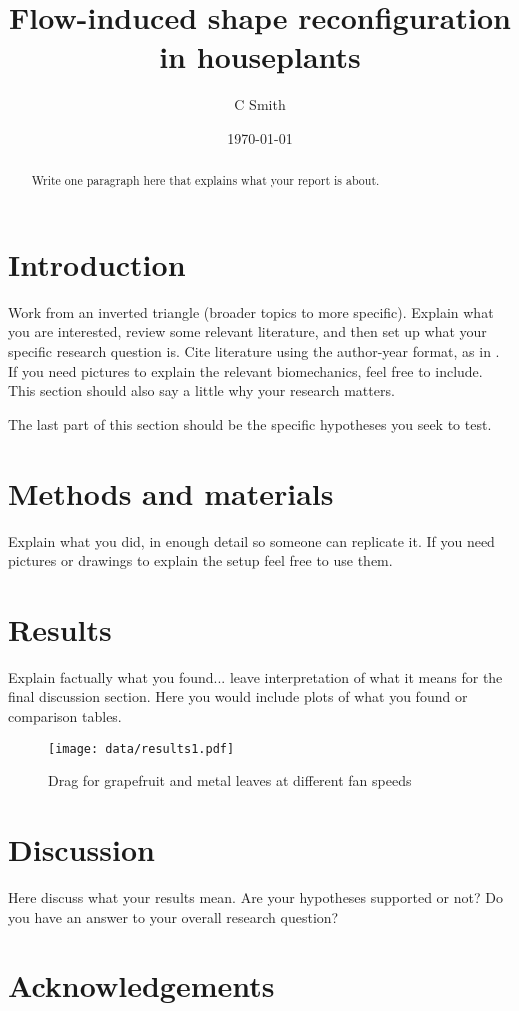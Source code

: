 \documentclass{article}
\title{Flow-induced shape reconfiguration in houseplants}
\author{C Smith}
\date{\today}
\begin{document}
\maketitle
\begin{abstract}
Write one paragraph here that explains what your report is about.
\end{abstract}

\section{Introduction}
Work from an inverted triangle (broader topics to more specific). Explain what you are interested, review some relevant literature, and then set up what your specific research question is. Cite literature using the author-year format, as in \citep{buck2020go}. If you need pictures to explain the relevant biomechanics, feel free to include. This section should also say a little why your research matters. 

The last part of this section should be the specific hypotheses you seek to test. 

\section{Methods and materials}
Explain what you did, in enough detail so someone can replicate it. If you need pictures or drawings to explain the setup feel free to use them. 

\section{Results}
Explain factually what you found... leave interpretation of what it means for the final discussion section. Here you would include plots of what you found or comparison tables.
\begin{figure}
    \begin{center}
        \texttt{[image: data/results1.pdf]}
    \end{center}
        \caption{Drag for grapefruit and metal leaves at different fan speeds}
    \label{fig:results1}
\end{figure}




\section{Discussion}
Here discuss what your results mean. Are your hypotheses supported or not? Do you have an answer to your overall research question?

\section{Acknowledgements}


\end{document}
